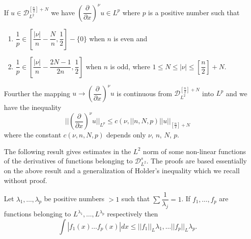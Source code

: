 \setcounter{dashprop}{1}
\begin{dashprop}\label{chap5-sec1-dashprop2}%
If $u \in \mathscr{D}^{[\frac{n}{2}]+N}_{L^2}$ we have
$\left(\dfrac{\partial}{\partial x}\right)^\nu u \in L^p$ where $p$ is a
positive number such that 
\begin{enumerate}[\rm(a)]
\item $\dfrac{1}{p}\in \left[ \dfrac{|\nu |}{n}-\dfrac{N}{n},
  \dfrac{1}{2}\right]-\{0\}$ when $n$ is even and  

\item $\dfrac{1}{p}\in \left[ \dfrac{|\nu
    |}{n}-\dfrac{2N-1}{2n}, \dfrac{1}{2}\right]$ when $n$ is odd,
  where  $1\leq N \leq |\nu|\leq \left[\dfrac{n}{2}\right] + N$. 
\end{enumerate}

Fourther the mapping $u \to \left(\dfrac{\partial}{\partial
  x}\right)^\nu u$ is continuous from
$\mathscr{D}^{[\frac{n}{2}]+N}_{L^2}$ into $L^p$ and 
we have the inequality 
\begin{equation}
|| \left(\frac{\partial}{\partial x}\right)^\nu u ||_{L^p} \leq c(\nu,
|| n, N, p) || u ||_{[\frac{n}{2}]+N} \tag{1.12}\label{chap5-eq1.12} 
\end{equation}
where the constant $c(\nu, n, N, p)$ depends only $\nu$, $n$, $N$, $p$.

The following result gives estimates in the $L^2$ norm of some
non-linear functions of the derivatives of functions belonging to
$\mathscr{D}^s_{L^2}$. The proofs are based essentially on the above
result and a generalization of Holder's inequality which we recall
without proof. 
\end{dashprop}

\begin{proposition}\label{chap5-sec1-prop3}%
 Let $\lambda_1, \ldots, \lambda_p$
  be positive numbers $> 1$ such that $\sum
  \dfrac{1}{\lambda_j}=1$. If $f_1, \ldots, f_p$ are functions
  belonging to $L^{\lambda_1}, \ldots, L^{\lambda_p}$ respectively
  then 
\begin{equation*}
\int | f_1(x) \ldots f_p (x) | dx \leq || f_1||_{L}\lambda_1, \ldots ||
f_p ||_L\lambda_p. \tag{1.13}\label{chap5-eq1.13} 
\end{equation*}
\end{proposition}

